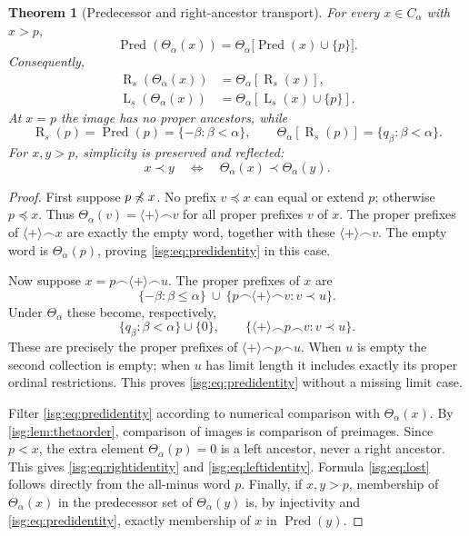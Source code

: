 \documentclass[11pt]{article}
\newtheorem{theorem}{Theorem}[section]
\theoremstyle{definition}
\theoremstyle{remark}
\newcommand{\Pred}{\operatorname{Pred}}
\newcommand{\Rs}{\operatorname{R}_{s}}
\newcommand{\Ls}{\operatorname{L}_{s}}
\newcommand{\cat}{\mathbin{\frown}}
\newcommand{\plus}{\langle+\rangle}
\newcommand{\pr}{\mathrel{\prec}}
\newcommand{\pre}{\mathrel{\preccurlyeq}}
\newcommand{\tht}{\Theta_{\alpha}}
\begin{document}
\begin{theorem}[Predecessor and right-ancestor transport]\label{isg:thm:tree}
For every $x\in C_\alpha$ with $x>p$,
\begin{equation}\label{isg:eq:predidentity}
 \Pred(\tht(x))=\tht\bigl[\Pred(x)\cup\{p\}\bigr].
\end{equation}
Consequently,
\begin{align}
 \Rs(\tht(x))&=\tht[\Rs(x)],\label{isg:eq:rightidentity}\\
 \Ls(\tht(x))&=\tht[\Ls(x)\cup\{p\}].\label{isg:eq:leftidentity}
\end{align}
At $x=p$ the image has no proper ancestors, while
\begin{equation}\label{isg:eq:lost}
 \Rs(p)=\Pred(p)=\{-\beta:\beta<\alpha\},\qquad
 \tht[\Rs(p)]=\{q_\beta:\beta<\alpha\}.
\end{equation}
For $x,y>p$, simplicity is preserved and reflected:
\[
 x\pr y\quad\Longleftrightarrow\quad\tht(x)\pr\tht(y).
\]
\end{theorem}
\begin{proof}
First suppose $p\not\pre x$. No prefix $v\pre x$ can equal or extend
$p$; otherwise $p\pre x$. Thus $\tht(v)=\plus\cat v$ for all
proper prefixes $v$ of $x$. The proper prefixes of $\plus\cat x$ are
exactly the empty word, together with these $\plus\cat v$.
The empty word is $\tht(p)$, proving \eqref{isg:eq:predidentity} in this
case.

Now suppose $x=p\cat\plus\cat u$. The proper prefixes of $x$ are
\[
 \{-\beta:\beta\le\alpha\}
 \ \cup\ \{p\cat\plus\cat v:v\pr u\}.
\]
Under $\tht$ these become, respectively,
\[
 \{q_\beta:\beta<\alpha\}\cup\{0\},
 \qquad \{\plus\cat p\cat v:v\pr u\}.
\]
These are precisely the proper prefixes of $\plus\cat p\cat u$.
When $u$ is empty the second collection is empty; when $u$ has limit
length it includes exactly its proper ordinal restrictions. This proves
\eqref{isg:eq:predidentity} without a missing limit case.

Filter \eqref{isg:eq:predidentity} according to numerical comparison with
$\tht(x)$. By \cref{isg:lem:thetaorder}, comparison of images is comparison
of preimages. Since $p<x$, the extra element $\tht(p)=0$ is a left
ancestor, never a right ancestor. This gives
\eqref{isg:eq:rightidentity} and \eqref{isg:eq:leftidentity}.
Formula \eqref{isg:eq:lost} follows directly from the all-minus word $p$.
Finally, if $x,y>p$, membership of $\tht(x)$ in the predecessor set of
$\tht(y)$ is, by injectivity and \eqref{isg:eq:predidentity}, exactly
membership of $x$ in $\Pred(y)$.
\end{proof}
\end{document}
